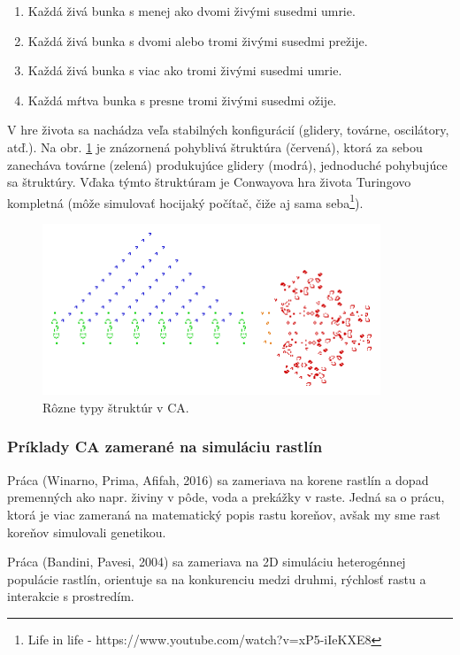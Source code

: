 \documentclass[12pt]{article}
\begin{document}
\begin{enumerate}
	\item Každá živá bunka s menej ako dvomi živými susedmi umrie.
	\item Každá živá bunka s dvomi alebo tromi živými susedmi prežije.
	\item Každá živá bunka s viac ako tromi živými susedmi umrie.
	\item Každá mŕtva bunka s presne tromi živými susedmi ožije.
\end{enumerate}

V hre života sa nachádza veľa stabilných konfigurácií (glidery, továrne,
oscilátory, atď.). Na obr. \ref{obr:conwayova hra zivota} je znázornená
pohyblivá štruktúra (červená), ktorá
za sebou zanecháva továrne (zelená) produkujúce glidery (modrá),
jednoduché pohybujúce sa štruktúry.
Vďaka týmto štruktúram je Conwayova hra života Turingovo kompletná (môže
simulovať hocijaký počítač, čiže aj sama seba\footnote
{Life in life - https://www.youtube.com/watch?v=xP5-iIeKXE8}).

\begin{figure}[ht]
	\centering
	\includegraphics[width=0.9\textwidth]{res/Conways_game_of_life_breeder.png}
	\caption{Rôzne typy štruktúr v CA.}
	\label{obr:conwayova hra zivota}
\end{figure}

\subsubsection{Príklady CA zamerané na simuláciu rastlín}

Práca (Winarno, Prima, Afifah, 2016) sa zameriava na
korene rastlín a dopad premenných ako napr. živiny v pôde, voda a prekážky
v raste. Jedná sa o prácu, ktorá je viac zameraná na matematický popis rastu koreňov,
avšak my sme rast koreňov simulovali genetikou.

Práca (Bandini, Pavesi, 2004) sa zameriava na 2D simuláciu heterogénnej populácie
rastlín, orientuje sa na konkurenciu medzi druhmi, rýchlosť rastu a interakcie
s prostredím.
\end{document}
